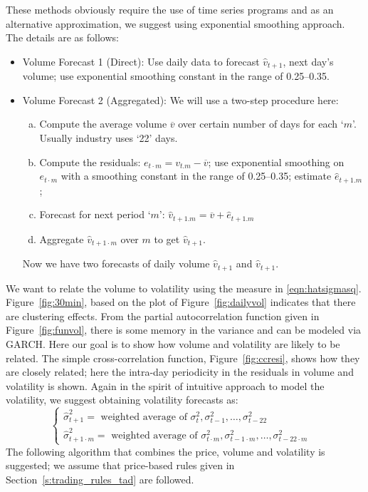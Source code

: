 	
These methods obviously require the use of time series programs and as an alternative approximation, we suggest using exponential smoothing approach. The details are as follows:
	\begin{itemize}
	\item Volume Forecast 1 (Direct): Use daily data to forecast $\hat{v}_{t+1}$, next day's volume; use exponential smoothing constant in the range of 0.25--0.35.
	\item Volume Forecast 2 (Aggregated): We will use a two-step procedure here:
		\begin{enumerate}[(a)]
		\item Compute the average volume $\overline{v}$ over certain number of days for each `$m$'. Usually industry uses `22' days.
		\item Compute the residuals: $e_{t\cdot m} = v_{t . m} - \overline{v}$; use exponential smoothing on $e_{t\cdot m}$ with a smoothing constant in the range of 0.25--0.35; estimate $\hat{e}_{t+1 . m}$;
		\item Forecast for next period `$m$': $\hat{v}_{t+1. m}=\overline{v}+\hat{e}_{t+1 . m}$
		\item Aggregate $\hat{v}_{t+1\cdot m}$ over $m$ to get $\hat{v}_{t+1}$. 
		\end{enumerate}
	Now we have two forecasts of daily volume $\hat{v}_{t+1}$ and $\hat{v}_{t+1}$.
	\end{itemize}
We want to relate the volume to volatility using the measure in \eqref{eqn:hatsigmasq}. Figure~\ref{fig:30min}, based on the plot of Figure~\ref{fig:dailyvol} indicates that there are clustering effects. From the partial autocorrelation function given in Figure~\ref{fig:funvol}, there is some memory in the variance and can be modeled via GARCH. Here our goal is to show how volume and volatility are likely to be related. The simple cross-correlation function, Figure~\ref{fig:ccresi}, shows how they are closely related; here the intra-day periodicity in the residuals in volume and volatility is shown. Again in the spirit of intuitive approach to model the volatility, we suggest obtaining volatility forecasts as:
	\[
	\begin{cases}
	\hat{\sigma}_{t+1}^2 = \text{ weighted average of } \sigma_t^2, \sigma_{t-1}^2, \ldots, \sigma_{t-22}^2 & \\
	\hat{\sigma}^2_{t+1 \cdot m}= \text{ weighted average of } \sigma_{t\cdot m}^2, \sigma_{t-1 \cdot m}^2, \ldots, \sigma_{t-22\cdot m}^2 & 
	\end{cases}
	\]
The following algorithm that combines the price, volume and volatility is suggested; we assume that price-based rules given in Section~\ref{s:trading_rules_tad} are followed.
